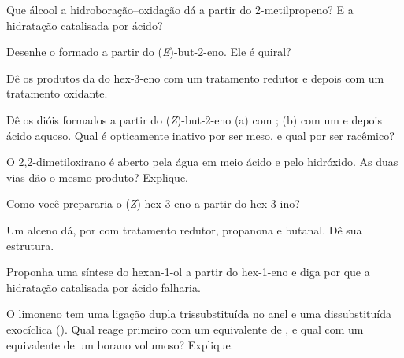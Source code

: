 \begin{exercise}[$\star$]\label{exo:b2:alkene-redox:2}
Que álcool a hidroboração--oxidação dá a partir do 2-metilpropeno? E a
hidratação catalisada por ácido?
\end{exercise}

\begin{exercise}[$\star$]\label{exo:b2:alkene-redox:3}
Desenhe o  formado a partir do (\textit{E})-but-2-eno. Ele é quiral?
\end{exercise}

\begin{exercise}[$\star$]\label{exo:b2:alkene-redox:4}
Dê os produtos da  do hex-3-eno com um tratamento redutor e depois com
um tratamento oxidante.
\end{exercise}

\begin{exercise}[$\star\star$]\label{exo:b2:alkene-redox:5}
Dê os dióis formados a partir do (\textit{Z})-but-2-eno (a) com ; (b) com um
 e depois ácido aquoso. Qual é opticamente inativo por ser meso, e qual
por ser racêmico?
\end{exercise}

\begin{exercise}[$\star\star$]\label{exo:b2:alkene-redox:6}
O 2,2-dimetiloxirano é aberto pela água em meio ácido e pelo hidróxido. As duas
vias dão o mesmo produto? Explique.
\end{exercise}

\begin{exercise}[$\star\star$]\label{exo:b2:alkene-redox:7}
Como você prepararia o (\textit{Z})-hex-3-eno a partir do hex-3-ino?
\end{exercise}

\begin{exercise}[$\star\star$]\label{exo:b2:alkene-redox:8}
Um alceno  dá, por  com tratamento redutor, propanona e
butanal. Dê sua estrutura.
\end{exercise}

\begin{exercise}[$\star\star$]\label{exo:b2:alkene-redox:9}
Proponha uma síntese do hexan-1-ol a partir do hex-1-eno e diga por que a
hidratação catalisada por ácido falharia.
\end{exercise}

\begin{exercise}[$\star\star\star$]\label{exo:b2:alkene-redox:10}
O limoneno tem uma ligação dupla trissubstituída no anel e uma dissubstituída
exocíclica (). Qual reage primeiro com um equivalente de
, e qual com um equivalente de um borano volumoso? Explique.
\end{exercise}

